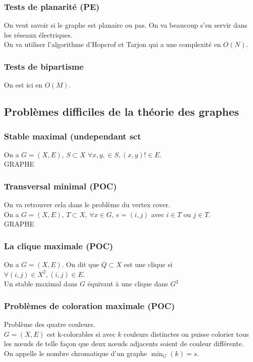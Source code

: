 \subsubsection{Tests de planarité (PE)}
On veut savoir si le graphe est planaire ou pas. On va beaucoup s'en servir dans les réseaux électriques.\\
On va utiliser l'algorithme d'Hopcrof et Tarjon qui a une complexité en $O(N)$.
\subsubsection{Tests de bipartisme}
On est ici en $O(M)$.

\subsection{Problèmes difficiles de la théorie des graphes}
\subsubsection{Stable maximal (undependant sct}
On a $G=(X,E)$, $S\subset X$ $\forall x, y, \in S, (x,y)!\in E$.\\
GRAPHE
\subsubsection{Transversal minimal (POC)}
On va retrouver cela dans le problème du vertex cover.\\
On a $G=(X,E)$, $T\subset X$, $\forall x\in G$, $e=(i,j)$ avec $i\in T$ ou $j\in T$.\\
GRAPHE
\subsubsection{La clique maximale (POC)}
On a $G=(X,E)$. On dit que $Q\subset X$ est une clique si $\forall(i,j)\in X^2, (i,j)\in E$.\\
Un stable maximal dans $G$ équivaut à une clique dans $G^2$
\subsubsection{Problèmes de coloration maximale (POC)}
Problème des quatre couleurs.\\
$G=(X,E)$ est k-colorables si avec $k$ couleurs distinctes on puisse colorier tous les nœuds de telle façon que deux nœuds adjacents soient de couleur différente.\\
On appelle le nombre chromatique d'un graphe $\min_G(k)=s$.